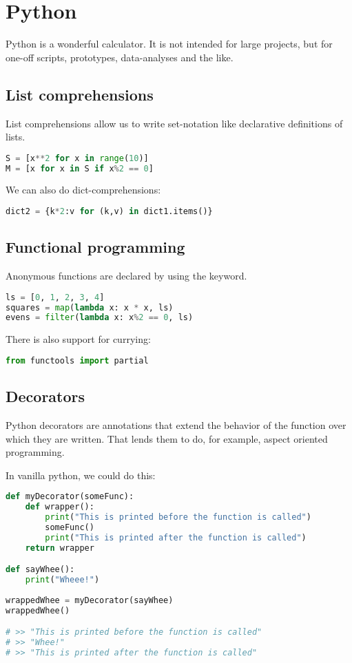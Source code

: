 \section{Python}

Python is a wonderful calculator. It is not intended for large projects, but for one-off scripts, prototypes, data-analyses and the like. 

\subsection{List comprehensions}

List comprehensions allow us to write set-notation like declarative definitions of lists.

\begin{lstlisting}[language=python]
S = [x**2 for x in range(10)]
M = [x for x in S if x%2 == 0]
\end{lstlisting}

We can also do dict-comprehensions: 
\begin{lstlisting}[language=python]
dict2 = {k*2:v for (k,v) in dict1.items()}
\end{lstlisting}

\subsection{Functional programming}

Anonymous functions are declared by using the  keyword. 
\begin{lstlisting}[language=python]
ls = [0, 1, 2, 3, 4]
squares = map(lambda x: x * x, ls)
evens = filter(lambda x: x%2 == 0, ls)
\end{lstlisting}

There is also support for currying: 
\begin{lstlisting}[language=python]
from functools import partial
\end{lstlisting}

\subsection{Decorators}
Python decorators are annotations that extend the behavior of the function over which they are written. That lends them to do, for example, aspect oriented programming.

In vanilla python, we could do this: 

\begin{lstlisting}[language=python]
def myDecorator(someFunc):
    def wrapper():
        print("This is printed before the function is called")
        someFunc()
        print("This is printed after the function is called")
    return wrapper

def sayWhee():
    print("Wheee!")
    
wrappedWhee = myDecorator(sayWhee)
wrappedWhee()

# >> "This is printed before the function is called"
# >> "Whee!"
# >> "This is printed after the function is called"
\end{lstlisting}



